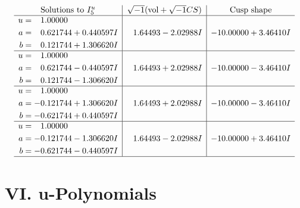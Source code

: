 \documentclass[1p]{elsarticle_modified}
\theoremstyle{definition}
\newcommand{\I}{\sqrt{-1}}
\begin{document}
$$\begin{array}{c|c|c}  
\text{Solutions to }I^u_{5}& \I (\text{vol} + \sqrt{-1}CS) & \text{Cusp shape}\\
 \hline 
\begin{aligned}
u &= \phantom{-}1.00000\phantom{ +0.000000I} \\
a &= \phantom{-}0.621744 + 0.440597 I \\
b &= \phantom{-}0.121744 + 1.306620 I\end{aligned}
 & \phantom{-}1.64493 - 2.02988 I & -10.00000 + 3.46410 I \\ \hline\begin{aligned}
u &= \phantom{-}1.00000\phantom{ +0.000000I} \\
a &= \phantom{-}0.621744 - 0.440597 I \\
b &= \phantom{-}0.121744 - 1.306620 I\end{aligned}
 & \phantom{-}1.64493 + 2.02988 I & -10.00000 - 3.46410 I \\ \hline\begin{aligned}
u &= \phantom{-}1.00000\phantom{ +0.000000I} \\
a &= -0.121744 + 1.306620 I \\
b &= -0.621744 + 0.440597 I\end{aligned}
 & \phantom{-}1.64493 + 2.02988 I & -10.00000 - 3.46410 I \\ \hline\begin{aligned}
u &= \phantom{-}1.00000\phantom{ +0.000000I} \\
a &= -0.121744 - 1.306620 I \\
b &= -0.621744 - 0.440597 I\end{aligned}
 & \phantom{-}1.64493 - 2.02988 I & -10.00000 + 3.46410 I\\
 \hline 
 \end{array}$$\newpage
\newpage\renewcommand{\arraystretch}{1}
\centering \section*{ VI. u-Polynomials}
\end{document}
